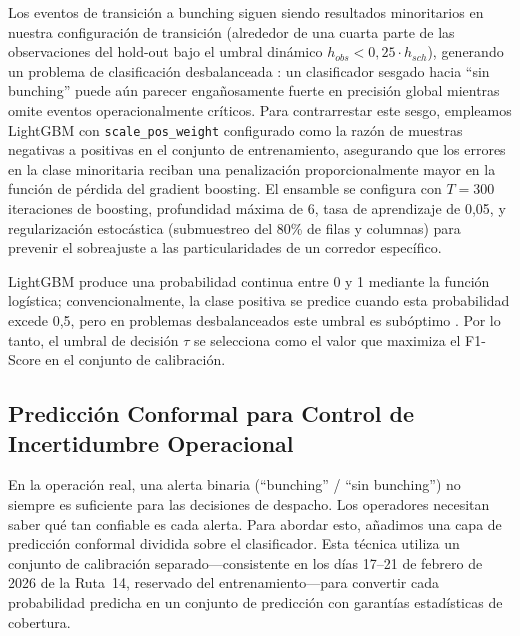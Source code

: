 \documentclass[fleqn,10pt,lineno]{wlpeerj}
\begin{document}
Los eventos de transici\'on a bunching siguen siendo resultados minoritarios en nuestra configuraci\'on de transici\'on (alrededor de una cuarta parte de las observaciones del hold-out bajo el umbral din\'amico $h_{obs} < 0,25 \cdot h_{sch}$), generando un problema de clasificaci\'on desbalanceada \citep{16}: un clasificador sesgado hacia ``sin bunching'' puede a\'un parecer enga\~nosamente fuerte en precisi\'on global mientras omite eventos operacionalmente cr\'iticos. Para contrarrestar este sesgo, empleamos LightGBM \citep{32} con \texttt{scale\_pos\_weight} configurado como la raz\'on de muestras negativas a positivas en el conjunto de entrenamiento, asegurando que los errores en la clase minoritaria reciban una penalizaci\'on proporcionalmente mayor en la funci\'on de p\'erdida del gradient boosting. El ensamble se configura con $T=300$ iteraciones de boosting, profundidad m\'axima de 6, tasa de aprendizaje de 0,05, y regularizaci\'on estoc\'astica (submuestreo del 80\% de filas y columnas) para prevenir el sobreajuste a las particularidades de un corredor espec\'ifico.

LightGBM produce una probabilidad continua entre 0 y 1 mediante la funci\'on log\'istica; convencionalmente, la clase positiva se predice cuando esta probabilidad excede 0,5, pero en problemas desbalanceados este umbral es sub\'optimo \citep{17}. Por lo tanto, el umbral de decisi\'on $\tau$ se selecciona como el valor que maximiza el F1-Score en el conjunto de calibraci\'on.

\subsection{Predicci\'on Conformal para Control de Incertidumbre Operacional}

En la operaci\'on real, una alerta binaria (``bunching'' / ``sin bunching'') no siempre es suficiente para las decisiones de despacho. Los operadores necesitan saber qu\'e tan confiable es cada alerta. Para abordar esto, a\~nadimos una capa de predicci\'on conformal dividida sobre el clasificador. Esta t\'ecnica utiliza un conjunto de calibraci\'on separado---consistente en los d\'ias 17--21 de febrero de 2026 de la Ruta~14, reservado del entrenamiento---para convertir cada probabilidad predicha en un conjunto de predicci\'on con garant\'ias estad\'isticas de cobertura.
\end{document}

